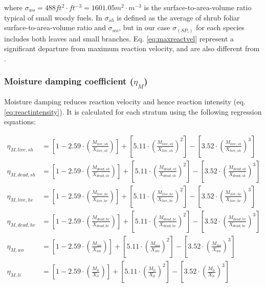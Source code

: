 \documentclass[]{book}
\begin{document}
where \(\sigma_{wo} = 488 ft^2\cdot ft^{-3} = 1601.05 m^2\cdot m^{-3}\)
is the surface-to-area-volume ratio typical of small woody fuels. In
\citet{Prichard2013} \(\sigma_{sh}\) is defined as the average of shrub
foliar surface-to-area-volume ratio and \(\sigma_{wo}\), but in our case
\(\sigma_(SP_i)\) for each species includes both leaves and small
branches. Eq. \eqref{eq:maxreactvel} represent a significant departure
from \citet{Rothermel1972} maximum reaction velocity, and are also
different from \citet{Sandberg2007}.

\subsubsection{\texorpdfstring{Moisture damping coefficient
(\(\eta_M\))}{Moisture damping coefficient (\textbackslash{}eta\_M)}}\label{moisture-damping-coefficient-eta_m}

Moisture damping reduces reaction velocity and hence reaction intensity
(eq. \eqref{eq:reactintensity}). It is calculated for each stratum using
the following regression equations:

\begin{eqnarray}
\eta_{M, live, sh} &= \left[1-2.59\cdot \left(\frac{M_{live, sh}}{X_{live, sh}}\right)\right] +\left[ 5.11\cdot \left(\frac{M_{live, sh}}{X_{live, sh}}\right)^2\right]-\left[ 3.52\cdot \left(\frac{M_{live, sh}}{X_{live, sh}}\right)^3\right] \\
\eta_{M, dead, sh} &= \left[1-2.59\cdot \left(\frac{M_{dead, sh}}{X_{dead, sh}}\right)\right] +\left[ 5.11\cdot \left(\frac{M_{dead, sh}}{X_{dead, sh}}\right)^2\right]-\left[ 3.52\cdot \left(\frac{M_{dead, sh}}{X_{dead, sh}}\right)^3\right] \\
\eta_{M, live, he} &= \left[1-2.59\cdot \left(\frac{M_{live, he}}{X_{live, he}}\right)\right] +\left[ 5.11\cdot \left(\frac{M_{live, he}}{X_{live, he}}\right)^2\right]-\left[ 3.52\cdot \left(\frac{M_{live, he}}{X_{live, he}}\right)^3\right] \\
\eta_{M, dead, he} &= \left[1-2.59\cdot \left(\frac{M_{dead, he}}{X_{dead, he}}\right)\right] +\left[ 5.11\cdot \left(\frac{M_{dead, he}}{X_{dead, he}}\right)^2\right]-\left[ 3.52\cdot \left(\frac{M_{dead, he}}{X_{dead, he}}\right)^3\right] \\
\eta_{M, wo} &= \left[1-2.59\cdot \left(\frac{M_{wo}}{X_{wo}}\right)\right] +\left[ 5.11\cdot \left(\frac{M_{wo}}{X_{wo}}\right)^2\right]-\left[ 3.52\cdot \left(\frac{M_{wo}}{X_{wo}}\right)^3\right] \\
\eta_{M, li} &= \left[1-2.59\cdot \left(\frac{M_{li}}{X_{li}}\right)\right] +\left[ 5.11\cdot \left(\frac{M_{li}}{X_{li}}\right)^2\right]-\left[ 3.52\cdot \left(\frac{M_{li}}{X_{li}}\right)^3\right] 
\label{eq:moistdamp}
\end{eqnarray}
\end{document}
